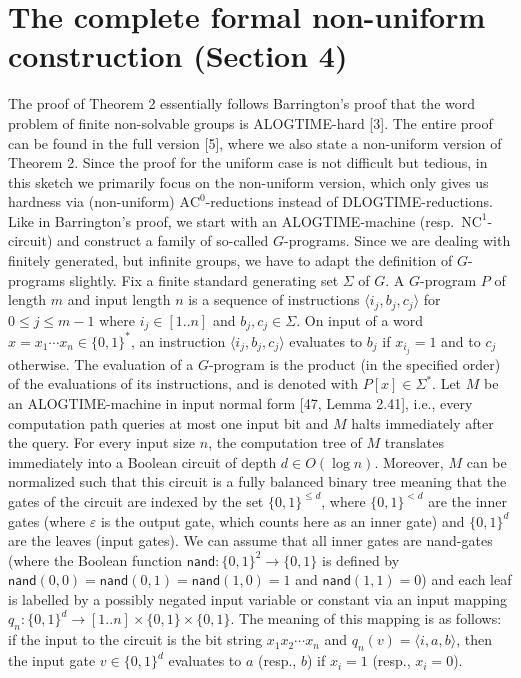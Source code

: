 \documentclass[10pt,a4paper]{article}
\begin{document}
\section*{The complete formal non-uniform construction (Section 4)}
The proof of Theorem 2 essentially follows Barrington's proof that the word problem of finite non-solvable groups is ALOGTIME-hard [3]. The entire proof can be found in the full version [5], where we also state a non-uniform version of Theorem 2. Since the proof for the uniform case is not difficult but tedious, in this sketch we primarily focus on the non-uniform version, which only gives us hardness via (non-uniform) $\mathrm{AC}^0$-reductions instead of DLOGTIME-reductions.
Like in Barrington's proof, we start with an ALOGTIME-machine (resp.\ $\mathrm{NC}^1$-circuit) and construct a family of so-called $G$-programs. Since we are dealing with finitely generated, but infinite groups, we have to adapt the definition of $G$-programs slightly.
Fix a finite standard generating set $\Sigma$ of $G$. A $G$-program $P$ of length $m$ and input length $n$ is a sequence of instructions $\langle i_j,b_j,c_j\rangle$ for $0\le j\le m-1$ where $i_j\in[1..n]$ and $b_j,c_j\in\Sigma$. On input of a word $x=x_1\cdots x_n\in\{0,1\}^*$, an instruction $\langle i_j,b_j,c_j\rangle$ evaluates to $b_j$ if $x_{i_j}=1$ and to $c_j$ otherwise. The evaluation of a $G$-program is the product (in the specified order) of the evaluations of its instructions, and is denoted with $P[x]\in\Sigma^*$.
Let $M$ be an ALOGTIME-machine in input normal form [47, Lemma 2.41], i.e., every computation path queries at most one input bit and $M$ halts immediately after the query. For every input size $n$, the computation tree of $M$ translates immediately into a Boolean circuit of depth $d\in O(\log n)$. Moreover, $M$ can be normalized such that this circuit is a fully balanced binary tree meaning that the gates of the circuit are indexed by the set $\{0,1\}^{\le d}$, where $\{0,1\}^{<d}$ are the inner gates (where $\varepsilon$ is the output gate, which counts here as an inner gate) and $\{0,1\}^d$ are the leaves (input gates). We can assume that all inner gates are nand-gates (where the Boolean function $\mathsf{nand}:\{0,1\}^2\to\{0,1\}$ is defined by $\mathsf{nand}(0,0)=\mathsf{nand}(0,1)=\mathsf{nand}(1,0)=1$ and $\mathsf{nand}(1,1)=0$) and each leaf is labelled by a possibly negated input variable or constant via an input mapping $q_n:\{0,1\}^d\to[1..n]\times\{0,1\}\times\{0,1\}$. The meaning of this mapping is as follows: if the input to the circuit is the bit string $x_1x_2\cdots x_n$ and $q_n(v)=\langle i,a,b\rangle$, then the input gate $v\in\{0,1\}^d$ evaluates to $a$ (resp., $b$) if $x_i=1$ (resp., $x_i=0$).
\end{document}
